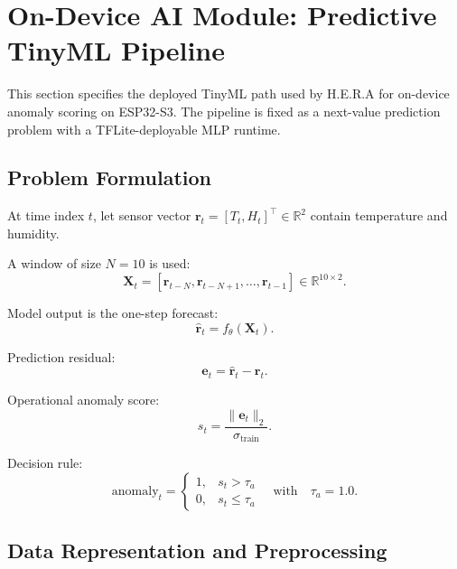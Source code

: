 \newpage
\section{On-Device AI Module: Predictive TinyML Pipeline}
\label{sec:tinyml}

This section specifies the deployed TinyML path used by H.E.R.A for
on-device anomaly scoring on ESP32-S3. The pipeline is fixed as a
next-value prediction problem with a TFLite-deployable MLP runtime.

\subsection{Problem Formulation}
\label{sec:tinyml-formulation}

At time index $t$, let sensor vector
$\mathbf{r}_t = [T_t, H_t]^\top \in \mathbb{R}^2$ contain temperature
and humidity.

A window of size $N=10$ is used:
\begin{equation}
\label{eq:window-input}
\mathbf{X}_t = [\mathbf{r}_{t-N}, \mathbf{r}_{t-N+1}, \dots, \mathbf{r}_{t-1}] 
\in \mathbb{R}^{10 \times 2}.
\end{equation}

Model output is the one-step forecast:
\begin{equation}
\label{eq:next-prediction}
\hat{\mathbf{r}}_t = f_\theta(\mathbf{X}_t).
\end{equation}

Prediction residual:
\begin{equation}
\label{eq:residual}
\mathbf{e}_t = \hat{\mathbf{r}}_t - \mathbf{r}_t.
\end{equation}

Operational anomaly score:
\begin{equation}
\label{eq:anomaly-score}
    s_t = \frac{\lVert \mathbf{e}_t \rVert_2}{\sigma_{\text{train}}}.
\end{equation}

Decision rule:
\begin{equation}
\label{eq:anomaly-rule}
\text{anomaly}_t =
\begin{cases}
1, & s_t > \tau_a \\
0, & s_t \leq \tau_a
\end{cases}
\quad \text{with} \quad \tau_a = 1.0.
\end{equation}

\subsection{Data Representation and Preprocessing}
\label{sec:tinyml-data}


